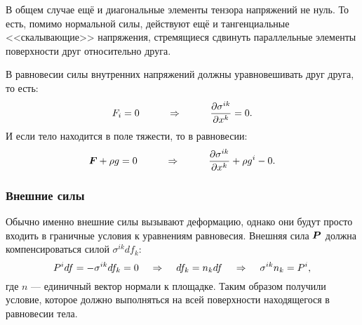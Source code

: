 В общем случае ещё и диагональные элементы тензора напряжений не нуль.
То есть, помимо нормальной силы, действуют ещё и тангенциальные <<скалывающие>> напряжения, стремящиеся сдвинуть параллельные элементы поверхности друг относительно друга.

В равновесии силы внутренних напряжений должны уравновешивать друг друга, то есть:
\begin{equation*}
	F_i = 0
	\hspace*{1 cm}
	\Rightarrow
	\hspace*{1 cm}
	\frac{\partial \sigma^{i k}}{\partial x^k} = 0.
\end{equation*}
И если тело находится в поле тяжести, то в равновесии:
\begin{equation*}
	\mbox{\boldmath $F$} + \rho g = 0
	\hspace*{1 cm}
	\Rightarrow
	\hspace*{1 cm}
	\frac{\partial\sigma^{ i k}}{\partial x^k} + \rho g^i - 0.
\end{equation*}

\subsubsection*{Внешние силы}
Обычно именно внешние силы вызывают деформацию, однако они будут просто входить в граничные условия к уравнениям равновесия. 
Внешняя сила $\mbox{\boldmath $P$}$ должна компенсироваться силой $\sigma^{i k} d f_k$:
\begin{equation*}
	P^i d f = - \sigma^{i k} d f_k = 0
	\hspace*{0.4 cm}
	\Rightarrow
	\hspace*{0.4 cm}
	d f_k = n_k d f
	\hspace*{0.4 cm}
	\Rightarrow
	\hspace*{0.4 cm}
	\sigma^{i k} n_k = P^i,
\end{equation*}
где $n$ --- единичный вектор нормали к площадке. Таким образом получили условие, которое должно выполняться на всей поверхности находящегося в равновесии тела.